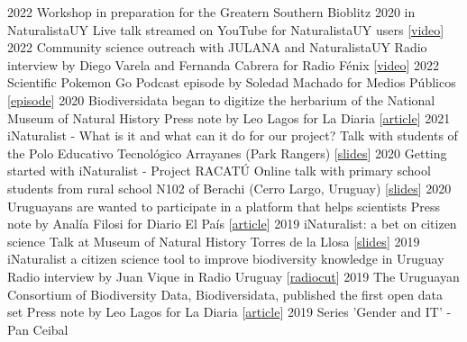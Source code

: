\documentclass[9pt]{developercv} %
\begin{document}
\begin{entrylist}
	\entrylong
		{2022}
		{Workshop in preparation for the Greatern Southern Bioblitz 2020 in NaturalistaUY}
		{}
		{Live talk streamed on YouTube for NaturalistaUY users [\href{https://youtu.be/sPKhUy3CJQ0}{video}]}
	\entrylong
		{2022}
		{Community science outreach with JULANA and NaturalistaUY}
		{}
		{Radio interview by Diego Varela and Fernanda Cabrera for Radio Fénix [\href{https://youtu.be/Scc01vg1PTs}{video}]}
	\entrylong
		{2022}
		{Scientific Pokemon Go}
		{}
		{Podcast episode by Soledad Machado for Medios Públicos [\href{https://open.spotify.com/episode/05X1u40HyvvTjuuYKjyJE2?si=jCNZ8hHmQ8S-CSfiNOCryQ}{episode}]}
	\entrylong
		{2020}
		{Biodiversidata began to digitize the herbarium of the National Museum of Natural History}
		{}
		{Press note by Leo Lagos for La Diaria [\href{https://ciencia.ladiaria.com.uy/articulo/2020/2/biodiversidata-comenzo-a-digitalizar-el-herbario-del-museo-nacional-de-historia-natural}{article}]}
	\entrylong
		{2021}
		{iNaturalist - What is it and what can it do for our project?}
		{}
		{Talk with students of the Polo Educativo Tecnológico Arrayanes (Park Rangers) [\href{https://flograttarola.com/pdf/Arrayanes_iNatUY.pdf}{slides}]}
	\entrylong
		{2020}
		{Getting started with iNaturalist - Project RACATÚ}
		{}
		{Online talk with primary school students from rural school N102 of Berachi (Cerro Largo, Uruguay) [\href{https://flograttarola.com/pdf/iNat_Berachi.pdf}{slides}]}
	\entrylong
		{2020}
		{Uruguayans are wanted to participate in a platform that helps scientists}
		{}
		{Press note by Analía Filosi for Diario El País [\href{https://www.elpais.com.uy/vida-actual/busca-uruguayos-participen-plataforma-ayuda-cientificos.html}{article}]}
	\entrylong
		{2019}
		{iNaturalist: a bet on citizen science}
		{}
		{Talk at Museum of Natural History Torres de la Llosa [\href{https://flograttarola.com/pdf/NaturalistaUy.pdf}{slides}]}
	\entrylong
		{2019}
		{iNaturalist a citizen science tool to improve biodiversity knowledge in Uruguay}
		{}
		{Radio interview by Juan Vique in Radio Uruguay [\href{https://radiouruguay.uy/inaturalist-una-apuesta-a-la-ciencia-ciudadana/}{radiocut}]}
	\entrylong
		{2019}
		{The Uruguayan Consortium of Biodiversity Data, Biodiversidata, published the first open data set}
		{}
		{Press note by Leo Lagos for La Diaria [\href{https://ciencia.ladiaria.com.uy/articulo/2019/7/el-consorcio-de-datos-de-biodiversidad-de-uruguay-biodiversidata-publico-el-primer-set-de-datos-abiertos/}{article}]}
	\entrylong
		{2019}
		{Series 'Gender and IT' -  Pan Ceibal}

\end{entrylist}
\end{document}
